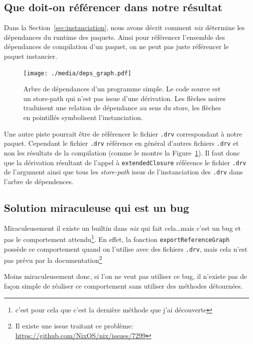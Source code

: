\documentclass[a4paper,12pt]{article}
\begin{document}
\subsection{Que doit-on référencer dans notre résultat}

Dans la Section~\ref{sec:instanciation}, nous avons décrit comment \emph{nix}
détermine les dépendances du runtime des paquets. Ainsi pour référencer
l'ensemble des dépendances de compilation d'un paquet, on ne peut pas juste
référencer le paquet instancier.


\begin{figure}[h]
	\centering
	\texttt{[image: ./media/deps\_graph.pdf]}
	\caption[Arbre de dépendances d'un programme simple.]{
		Arbre de dépendances d'un programme simple. Le code source est
		un store-path qui n'est pas issue d'une
		dérivation\footnotemark. Les flèches noires traduisent une
		relation de dépendance au sens du store, les flèches en
		pointillés symbolisent l'instanciation.
	}\label{fig:deps_exemple}
\end{figure}


Une autre piste pourrait être de référencer le fichier \texttt{.drv}
correspondant à notre paquet. Cependant le fichier \texttt{.drv} référence en
général d'autres fichiers \texttt{.drv} et non les résultats de la compilation
(comme le montre la Figure~\ref{fig:deps_exemple}).
Il faut donc que la dérivation résultant de l'appel à \texttt{extendedClosure}
référence le fichier \texttt{.drv} de l'argument ainsi que tous les
\emph{store-path} issus de l'instanciation des \texttt{.drv} dans l'arbre de
dépendences.

\subsection{Solution miraculeuse qui est un bug}
Miraculeusement il existe un builtin dans \emph{nix} qui fait cela\dots mais
c'est un bug et pas le comportement attendu\footnote{c'est pour cela que c'est
la dernière méthode que j'ai découverte}. En effet, la fonction
\texttt{exportReferenceGraph} possède ce comportement quand on l'utilise avec des
fichiers \texttt{.drv}, mais cela n'est pas prévu par la
documentation\footnote{Il existe une issue traitant ce problème:
\url{https://github.com/NixOS/nix/issues/7299}}

Moins miraculeusement donc, si l'on ne veut pas utiliser ce bug, il n'existe pas
de façon simple de réaliser ce comportement sans utiliser des méthodes
détournées.
\end{document}
